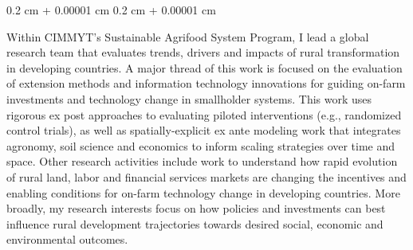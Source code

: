 \documentclass[10pt, letterpaper]{article}
\newenvironment{highlightsforbulletentries}{
    \begin{itemize}[
        topsep=0.10 cm,
        parsep=0.10 cm,
        partopsep=0pt,
        itemsep=0pt,
        leftmargin=10pt
    ]
}{
    \end{itemize}
} %
\newenvironment{onecolentry}{
    \begin{adjustwidth}{
        0.2 cm + 0.00001 cm
    }{
        0.2 cm + 0.00001 cm
    }
}{
    \end{adjustwidth}
} %
\let\hrefWithoutArrow\href
\renewcommand{\href}[2]{\hrefWithoutArrow{#1}{\ifthenelse{\equal{#2}{}}{ }{#2 }\raisebox{.15ex}{\footnotesize \faExternalLink*}}}
\begin{document}
        
        \begin{onecolentry}
        Within CIMMYT’s Sustainable Agrifood System Program, I lead a global research team that evaluates trends, drivers and impacts of rural transformation in developing countries. A major thread of this work is focused on the evaluation of extension methods and information technology innovations for guiding on-farm investments and technology change in smallholder systems. This work uses rigorous ex post approaches to evaluating piloted interventions (e.g., randomized control trials), as well as spatially-explicit ex ante modeling work that integrates agronomy, soil science and economics to inform scaling strategies over time and space. Other research activities include work to understand how rapid evolution of rural land, labor and financial services markets are changing the incentives and enabling conditions for on-farm technology change in developing countries. More broadly, my research interests focus on how policies and investments can best influence rural development trajectories towards desired social, economic and environmental outcomes.
        \end{onecolentry}

        \vspace{0.2 cm}



    





\end{document}
